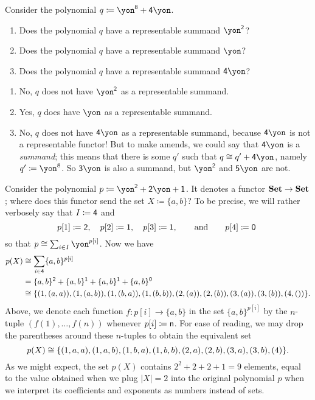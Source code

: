 \documentclass[Book-Poly]{subfiles}
\begin{document}
\begin{exercise}
    Consider the polynomial $q\coloneqq\yon^\8+\4\yon$.
    \begin{enumerate}
        \item Does the polynomial $q$ have a representable summand $\yon^\2$?
        \item Does the polynomial $q$ have a representable summand $\yon$?
        \item Does the polynomial $q$ have a representable summand $\4\yon$?
        \qedhere
    \end{enumerate}
    \begin{solution}
    \begin{enumerate}
        \item No, $q$ does not have $\yon^\2$ as a representable summand.
        \item Yes, $q$ does have $\yon$ as a representable summand.
        \item No, $q$ does not have $\4\yon$ as a representable summand, because $\4\yon$ is not a representable functor!
        But to make amends, we could say that $\4\yon$ is a \emph{summand}; this means that there is some $q'$ such that $q\iso q'+\4\yon$, namely $q'\coloneqq\yon^8$. So $\3\yon$ is also a summand, but $\yon^\2$ and $\5\yon$ are not.
    \end{enumerate}
    \end{solution}
\end{exercise}


\begin{example}\label{ex.verbose_poly_eval}
    Consider the polynomial $p\coloneqq\yon^\2+\2\yon+\1$.
    It denotes a functor $\mathbf{Set}\to\mathbf{Set}$; where does this functor send the set $X\coloneqq\{a,b\}$?
    To be precise, we will rather verbosely say that $I\coloneqq\textsf{4}$ and
    \[
    p[1]\coloneqq\textsf{2},\quad
    p[2]\coloneqq\textsf{1},\quad
    p[3]\coloneqq\textsf{1},\qquad\text{and}\qquad
    p[4]\coloneqq\textsf{0}\
    \]
    so that $p\cong\sum_{i\in I}\yon^{p[i]}$. Now we have
    \begin{align*}
        p(X) &\cong
        \sum_{i\in\textsf{4}}\{a,b\}^{p[i]} \\ &=
        \{a,b\}^{\textsf{2}} + \{a,b\}^{\textsf{1}} + \{a,b\}^{\textsf{1}} + \{a,b\}^{\textsf{0}} \\ &\cong
        \{(1,(a,a)),(1,(a,b)),(1,(b,a)),(1,(b,b)),(2,(a)),(2,(b)),(3,(a)),(3,(b)),(4,())\}.
    \end{align*}
    Above, we denote each function $f\colon p[i]\to\{a,b\}$ in the set $\{a,b\}^{p[i]}$ by the $n$-tuple $(f(1),\ldots,f(n))$ whenever $p[i]\coloneqq\mathsf{n}$.
    For ease of reading, we may drop the parentheses around these $n$-tuples to obtain the equivalent set
    \[
    p(X) \cong
    \{(1,a,a),(1,a,b),(1,b,a),(1,b,b),(2,a),(2,b),(3,a),(3,b),(4)\}.
    \]
    As we might expect, the set $p(X)$ contains $2^2+2+2+1=9$ elements, equal to the value obtained when we plug $|X|=2$ into the original polynomial $p$ when we interpret its coefficients and exponents as numbers instead of sets.
\end{example}
\end{document}
